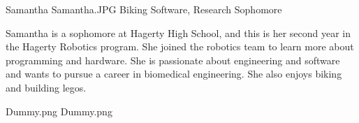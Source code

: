 \insertbio
{Samantha}
{Samantha.JPG}
{Biking}
{Software, Research}
{Sophomore}
{
Samantha is a sophomore at Hagerty High School, and this is her second year in the Hagerty Robotics program. She joined the robotics team to learn more about programming and hardware. She is passionate about engineering and software and wants to pursue a career in biomedical engineering. She also enjoys biking and building legos.

}
{Dummy.png}
{Dummy.png}
